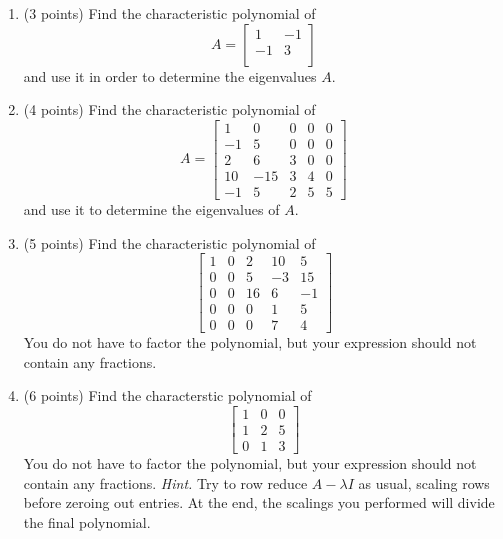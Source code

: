 \documentclass{article}
\theoremstyle{remark}
\begin{document}
\begin{enumerate}
\item (3 points) Find the characteristic polynomial of
  \begin{displaymath}
    A = \begin{bmatrix}
      1 & -1\\
      -1 & 3 \\
    \end{bmatrix}
  \end{displaymath}
  and use it in order to determine the eigenvalues $A$.
\item (4 points) Find the characteristic polynomial of
  \begin{displaymath}
    A =
    \begin{bmatrix}
      1 & 0 & 0 & 0 & 0 \\
      -1 & 5 & 0 & 0 & 0 \\
      2 & 6 & 3 & 0 & 0 \\
      10 & -15 & 3 & 4 & 0 \\
      -1 & 5 & 2 & 5 & 5
    \end{bmatrix}
  \end{displaymath}
  and use it to determine the eigenvalues of $A$.
\item (5 points) Find the characteristic polynomial of
  \begin{displaymath}
    \begin{bmatrix}
      1 & 0 & 2 & 10 & 5 \\
      0 & 0 & 5 & -3 & 15 \\
      0 & 0 & 16 & 6 & -1 \\
      0 & 0 & 0 & 1 & 5\\
      0 & 0 & 0 & 7 & 4
    \end{bmatrix}
  \end{displaymath}
  You do not have to factor the polynomial, but your expression should not contain any fractions.
\item (6 points) Find the characterstic polynomial of
  \begin{displaymath}
    \begin{bmatrix}
      1 & 0 & 0 \\
      1 & 2 & 5 \\
      0 & 1 & 3
    \end{bmatrix}
  \end{displaymath}
  You do not have to factor the polynomial, but your expression should not contain any fractions.
  \textit{Hint.} Try to row reduce $A - \lambda I$ as usual, scaling rows before zeroing out entries.
  At the end, the scalings you performed will divide the final polynomial.
\end{enumerate}
\end{document}
